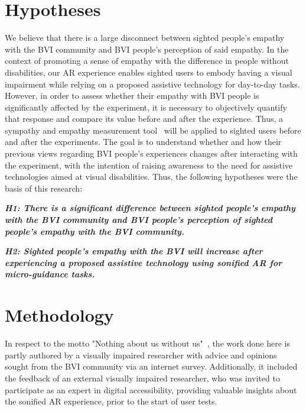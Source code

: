 \documentclass{vgtc}                          %
\begin{document}
\section{Hypotheses}
\label{section:hypotheses}

We believe that there is a large disconnect between sighted people’s empathy with the BVI community and BVI people's perception of said empathy. In the context of promoting a sense of empathy with the difference in people without disabilities, our AR experience enables sighted users to embody having a visual impairment while relying on a proposed assistive technology for day-to-day tasks. However, in order to assess whether their empathy with BVI people is significantly affected by the experiment, it is necessary to objectively quantify that response and compare its value before and after the experience. Thus, a sympathy and empathy measurement tool~\cite{Escalas:2003} will be applied to sighted users before and after the experiments. The goal is to understand whether and how their previous views regarding BVI people’s experiences changes after interacting with the experiment, with the intention of raising awareness to the need for assistive technologies aimed at visual disabilities. Thus, the following hypotheses were the basis of this research:

\smallskip
\smallskip

\textbf{\textit{H1: There is a significant difference between sighted people’s empathy with the BVI community and BVI people's perception of sighted people’s empathy with the BVI community.}}


\smallskip
\smallskip

\textbf{\textit{H2: Sighted people’s empathy with the BVI will increase after experiencing a proposed assistive technology using sonified AR for micro-guidance tasks.}}

\section{Methodology}
\label{section:methodology}
In respect to the motto "Nothing about us without us"~\cite{charlton1998nothing}, the work done here is partly authored by a visually impaired researcher with advice and opinions sought from the BVI community via an internet survey. Additionally, it included the feedback of an external visually impaired researcher, who was invited to participate as an expert in digital accessibility, providing valuable insights about the sonified AR experience, prior to the start of user tests.
\end{document}
